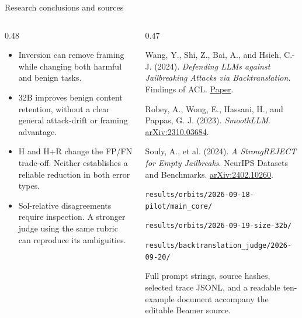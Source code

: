 \begin{frame}{Research conclusions and sources}
 \begin{columns}[T,onlytextwidth]
  \begin{column}{0.48\textwidth}
   \begin{itemize}\tightlist
    \item Inversion can remove framing while changing both harmful and benign tasks.
    \item 32B improves benign content retention, without a clear general attack-drift or framing advantage.
    \item H and H+R change the FP/FN trade-off. Neither establishes a reliable reduction in both error types.
    \item Sol-relative disagreements require inspection. A stronger judge using the same rubric can reproduce its ambiguities.
   \end{itemize}
  \end{column}
  \begin{column}{0.47\textwidth}
   {\fontsize{16}{21}\selectfont
   Wang, Y., Shi, Z., Bai, A., and Hsieh, C.-J. (2024). \emph{Defending LLMs against Jailbreaking Attacks via Backtranslation}. Findings of ACL. \href{https://aclanthology.org/2024.findings-acl.948/}{Paper}.\par\par\vspace{0.25cm}
   Robey, A., Wong, E., Hassani, H., and Pappas, G. J. (2023). \emph{SmoothLLM}. \href{https://arxiv.org/abs/2310.03684}{arXiv:2310.03684}.\par\par\vspace{0.25cm}
   Souly, A., et al. (2024). \emph{A StrongREJECT for Empty Jailbreaks}. NeurIPS Datasets and Benchmarks. \href{https://arxiv.org/abs/2402.10260}{arXiv:2402.10260}.\par
   \par\vspace{0.5cm}
   \texttt{results/orbits/2026-09-18-pilot/main\_core/}\par
   \texttt{results/orbits/2026-09-19-size-32b/}\par
   \texttt{results/backtranslation\_judge/2026-09-20/}\par
   \par\vspace{0.25cm}
   Full prompt strings, source hashes, selected trace JSONL, and a readable ten-example document accompany the editable Beamer source.}
  \end{column}
 \end{columns}
\end{frame}
